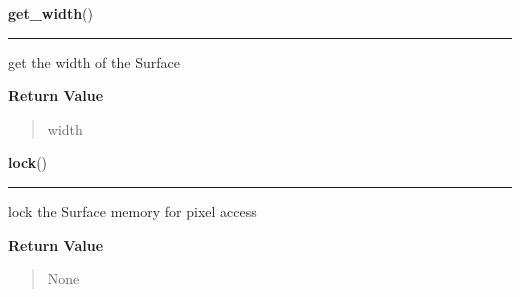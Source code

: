     \label{pygame:Surface:get_width}

    \vspace{0.5ex}

\hspace{.8\funcindent}\begin{boxedminipage}{\funcwidth}

    \raggedright \textbf{get\_width}()

    \vspace{-1.5ex}

    \rule{\textwidth}{0.5\fboxrule}
\setlength{\parskip}{2ex}
    get the width of the Surface

\setlength{\parskip}{1ex}
      \textbf{Return Value}
    \vspace{-1ex}

      \begin{quote}
      width

      \end{quote}

    \end{boxedminipage}

    \label{pygame:Surface:lock}

    \vspace{0.5ex}

\hspace{.8\funcindent}\begin{boxedminipage}{\funcwidth}

    \raggedright \textbf{lock}()

    \vspace{-1.5ex}

    \rule{\textwidth}{0.5\fboxrule}
\setlength{\parskip}{2ex}
    lock the Surface memory for pixel access

\setlength{\parskip}{1ex}
      \textbf{Return Value}
    \vspace{-1ex}

      \begin{quote}
      None

      \end{quote}

    \end{boxedminipage}

    \label{pygame:Surface:map_rgb}

    \vspace{0.5ex}

